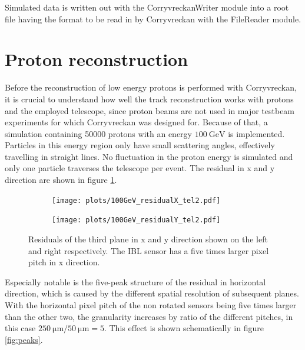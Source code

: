 Simulated data is written out with the CorryvreckanWriter module into a root file having the format to be read
in by Corryvreckan with the FileReader module.

\section{Proton reconstruction}\label{sec:proton_reconstruction}
Before the reconstruction of low energy protons is performed with Corryvreckan, it is crucial to understand how well the
track reconstruction works with protons and the employed telescope, since proton beams are not used in major testbeam
experiments for which Corryvreckan was designed for. Because of that, a simulation containing 50000 protons
with an energy $\SI{100}{\giga\eV}$ is implemented. Particles in this energy region only have small scattering angles, effectively travelling
in straight lines.
No fluctuation in the proton energy is simulated and only one particle traverses
the telescope per event. The residual in x and y direction are shown in figure \ref{fig:100GeV}.

\begin{figure}
  \hspace{-2.5cm}
  \begin{subfigure}{0.62\textwidth}
      \centering
      \texttt{[image: plots/100GeV\_residualX\_tel2.pdf]}
  \end{subfigure}
  \begin{subfigure}{0.62\textwidth}
      \hspace{0.95cm}
      \texttt{[image: plots/100GeV\_residualY\_tel2.pdf]}
  \end{subfigure}
  \caption{Residuals of the third plane in x and y direction shown on the left and right respectively.
  The IBL sensor has a five times larger pixel pitch in x direction. }
  \label{fig:100GeV}
\end{figure}

Especially notable is the five-peak structure of the residual in horizontal direction, which is caused by the different
spatial resolution of subsequent planes. With the horizontal pixel pitch of the non rotated sensors being
five times larger than the other two, the granularity increases by ratio of the different pitches, in this case
$\SI{250}{\micro\meter}/\SI{50}{\micro\meter} = 5$. This effect is shown schematically in figure \ref{fig:peaks}.

